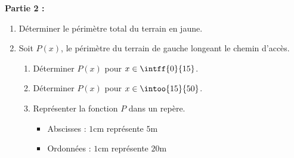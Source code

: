 \begin{exo}{}
	\textbf{Partie 2 :}

	\begin{enumerate}
		\item Déterminer le périmètre total du terrain en jaune.
		\item Soit $P(x)$, le périmètre du terrain de gauche longeant le chemin d'accès.
		      \begin{enumerate}
			      \item Déterminer $P(x)$ pour $x \in \intff{0}{15}$.
			      \item Déterminer $P(x)$ pour $x \in \intoo{15}{50}$.
			      \item Représenter la fonction $P$ dans un repère.
			            \begin{itemize}
				            \item Abscisses : $1$cm représente $5$m
				            \item Ordonnées : $1$cm représente $20\text{m}$
			            \end{itemize}
		      \end{enumerate}
	\end{enumerate}
\end{exo}
